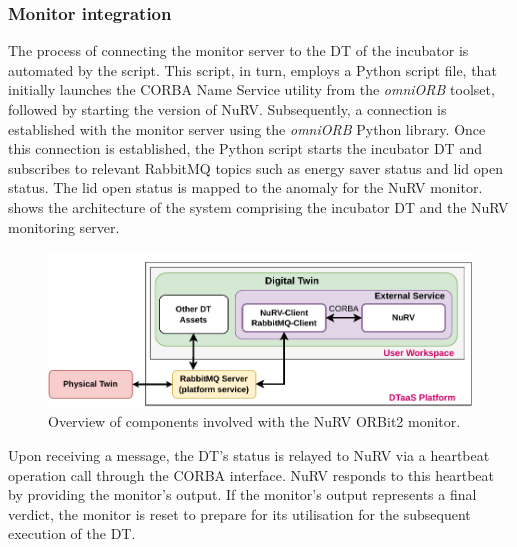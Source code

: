 \subsubsection{Monitor integration}
The process of connecting the monitor server to the DT of the incubator is automated by the  script. This script, in turn, employs a Python script file, that initially launches the  CORBA Name Service utility from the \textit{omniORB} toolset, followed by starting the  version of NuRV. Subsequently, a connection is established with the monitor server using the \textit{omniORB} Python library. Once this connection is established, the Python script starts the incubator DT and subscribes to relevant RabbitMQ topics such as energy saver status and lid open status. The lid open status is mapped to the anomaly for the NuRV monitor.\\
 shows the architecture of the system comprising the incubator DT and the NuRV monitoring server.%
%
\begin{figure}[ht]
	\centering
	\includegraphics[width=\columnwidth]{images/NuRV-native-integration.pdf}
	\caption{Overview of components involved with the NuRV ORBit2 monitor.}
	\label{fig:nurv-orbit-architecture-diagram}
\end{figure}
%
Upon receiving a message, the DT's status is relayed to NuRV via a heartbeat operation call through the CORBA interface. NuRV responds to this heartbeat by providing the monitor's output. If the monitor's output represents a final verdict, the monitor is reset to prepare for its utilisation for the subsequent execution of the DT.
